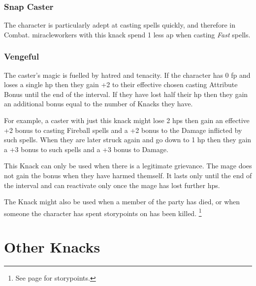 \begin{multicols}{2}

\subsubsection{Snap Caster}

The character is particularly adept at casting spells quickly, and therefore in Combat.
\Glspl{miracleworker} with this knack spend 1 less \gls{ap} when casting \textit{Fast} spells.

\subsubsection{Vengeful}

The caster's magic is fuelled by hatred and tenacity.
If the character has 0 \gls{fp} and loses a single \gls{hp} then they gain +2 to their effective chosen casting Attribute Bonus until the end of the interval.
If they have lost half their \gls{hp} then they gain an additional bonus equal to the number of Knacks they have.

For example, a caster with just this knack might lose 2 \glspl{hp} then gain an effective +2 bonus to casting Fireball spells and a +2 bonus to the Damage inflicted by such spells.
When they are later struck again and go down to 1 \gls{hp} then they gain a +3 bonus to such spells and a +3 bonus to Damage.

This Knack can only be used when there is a legitimate grievance.
The mage does not gain the bonus when they have harmed themself.
It lasts only until the end of the interval and can reactivate only once the mage has lost further \glspl{hp}.

The Knack might also be used when a member of the party has died, or when someone the character has spent \glspl{storypoint} on has been killed.%
\footnote{See page \pageref{stories} for \glspl{storypoint}.}


\end{multicols}

\section{Other Knacks}

